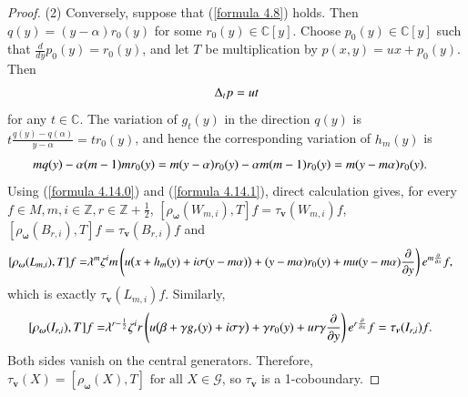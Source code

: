 \documentclass[12pt,reqno]{amsart}
\def\Z{\mathbb{Z}}
\def\C{\mathbb{C}}
\numberwithin{equation}{section}
\begin{document}
\begin{proof}
\rm{(2)} Conversely, suppose that (\ref{formula 4.8}) holds. Then $q(y)=(y-\alpha)r_0(y)$ for some $r_0(y)\in\C[y]$. Choose $p_0(y)\in\C[y]$ such that $\frac{d}{dy}p_0(y)=r_0(y)$, and let $T$ be multiplication by $p(x,y)=ux+p_0(y)$. Then 
\begin{equation}\label{formula 4.14.0}
\aligned
\Delta_tp=ut
\endaligned
\end{equation}
for any $t\in\C$. The variation of $g_t(y)$ in the direction $q(y)$ is $t\frac{q(y)-q(\alpha)}{y-\alpha}=tr_0(y)$, and hence the corresponding variation of $h_m(y)$ is
\begin{equation}\label{formula 4.14.1}
\aligned
m q(y)-\alpha(m-1)m r_0(y)
&=m(y-\alpha)r_0(y)-\alpha m(m-1)r_0(y)
=m(y-m\alpha)r_0(y).
\endaligned
\end{equation}
Using (\ref{formula 4.14.0}) and (\ref{formula 4.14.1}), direct calculation gives, for every $f\in M,m,i\in\Z,r\in\Z+\frac{1}{2}$, $[ \rho_{\boldsymbol{\omega}}(W_{m,i}),T]f=\tau_{\boldsymbol{v}}(W_{m,i})f$, $[ \rho_{\boldsymbol{\omega}}(B_{r,i}),T]f=\tau_{\boldsymbol{v}}(B_{r,i})f$
and
\begin{equation*}
\aligned
\relax[\rho_{\boldsymbol{\omega}}(L_{m,i}),T]f
=&\lambda^m\zeta^im\left(
u\bigl(x+h_m(y)+i\sigma(y-m\alpha)\bigr)+(y-m\alpha)r_0(y)
+mu(y-m\alpha)
\frac{\partial }{\partial y}
\right)e^{m\frac{\partial}{\partial{x}}}f,
\endaligned
\end{equation*}
which is exactly $\tau_{\boldsymbol{v}}(L_{m,i})f$. Similarly, 
\begin{equation*}
\aligned
\relax[\rho_{\boldsymbol{\omega}}(I_{r,i}),T]f
=&\lambda^{r-\frac12}\zeta^ir\left(
u\bigl(\beta+\gamma g_r(y)+i\sigma\gamma\bigr)+\gamma r_0(y)
+ur\gamma\frac{\partial }{\partial y}
\right)e^{r\frac{\partial}{\partial{x}}}f=\tau_{\boldsymbol{v}}(I_{r,i})f.
\endaligned
\end{equation*}
Both sides vanish on the central generators. Therefore,
$\tau_{\boldsymbol{v}}(X)=[\rho_{\boldsymbol{\omega}}(X),T]
\text{\ for all }X\in\mathcal G$,
so $\tau_{\boldsymbol{v}}$ is a 1-coboundary.
\end{proof}
\end{document}
